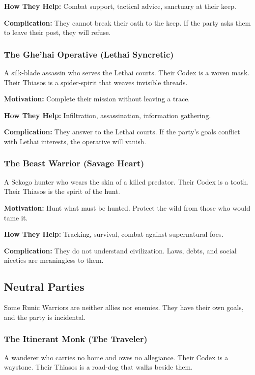 \textbf{How They Help:} Combat support, tactical advice, sanctuary at their keep.

\textbf{Complication:} They cannot break their oath to the keep. If the party asks them to leave their post, they will refuse.

\subsubsection{The Ghe'hai Operative (Lethai Syncretic)}

A silk-blade assassin who serves the Lethai courts. Their Codex is a woven mask. Their Thiasos is a spider-spirit that weaves invisible threads.

\textbf{Motivation:} Complete their mission without leaving a trace.

\textbf{How They Help:} Infiltration, assassination, information gathering.

\textbf{Complication:} They answer to the Lethai courts. If the party's goals conflict with Lethai interests, the operative will vanish.

\subsubsection{The Beast Warrior (Savage Heart)}

A Sekogo hunter who wears the skin of a killed predator. Their Codex is a tooth. Their Thiasos is the spirit of the hunt.

\textbf{Motivation:} Hunt what must be hunted. Protect the wild from those who would tame it.

\textbf{How They Help:} Tracking, survival, combat against supernatural foes.

\textbf{Complication:} They do not understand civilization. Laws, debts, and social niceties are meaningless to them.

\subsection{Neutral Parties}

Some Runic Warriors are neither allies nor enemies. They have their own goals, and the party is incidental.

\subsubsection{The Itinerant Monk (The Traveler)}

A wanderer who carries no home and owes no allegiance. Their Codex is a waystone. Their Thiasos is a road-dog that walks beside them.


